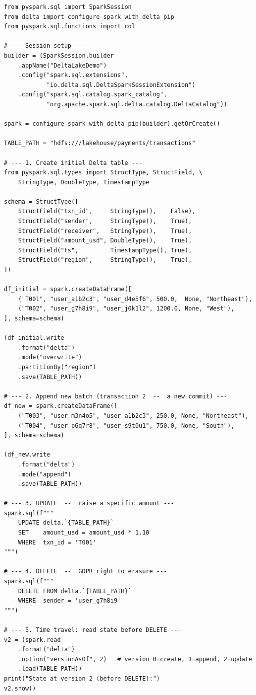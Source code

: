 \begin{lstlisting}[style=pyspark, caption={Delta Lake core operations in PySpark}]
from pyspark.sql import SparkSession
from delta import configure_spark_with_delta_pip
from pyspark.sql.functions import col

# --- Session setup ---
builder = (SparkSession.builder
    .appName("DeltaLakeDemo")
    .config("spark.sql.extensions",
            "io.delta.sql.DeltaSparkSessionExtension")
    .config("spark.sql.catalog.spark_catalog",
            "org.apache.spark.sql.delta.catalog.DeltaCatalog"))

spark = configure_spark_with_delta_pip(builder).getOrCreate()

TABLE_PATH = "hdfs:///lakehouse/payments/transactions"

# --- 1. Create initial Delta table ---
from pyspark.sql.types import StructType, StructField, \
    StringType, DoubleType, TimestampType

schema = StructType([
    StructField("txn_id",     StringType(),    False),
    StructField("sender",     StringType(),    True),
    StructField("receiver",   StringType(),    True),
    StructField("amount_usd", DoubleType(),    True),
    StructField("ts",         TimestampType(), True),
    StructField("region",     StringType(),    True),
])

df_initial = spark.createDataFrame([
    ("T001", "user_a1b2c3", "user_d4e5f6", 500.0,  None, "Northeast"),
    ("T002", "user_g7h8i9", "user_j0k1l2", 1200.0, None, "West"),
], schema=schema)

(df_initial.write
    .format("delta")
    .mode("overwrite")
    .partitionBy("region")
    .save(TABLE_PATH))

# --- 2. Append new batch (transaction 2  --  a new commit) ---
df_new = spark.createDataFrame([
    ("T003", "user_m3n4o5", "user_a1b2c3", 250.0, None, "Northeast"),
    ("T004", "user_p6q7r8", "user_s9t0u1", 750.0, None, "South"),
], schema=schema)

(df_new.write
    .format("delta")
    .mode("append")
    .save(TABLE_PATH))

# --- 3. UPDATE  --  raise a specific amount ---
spark.sql(f"""
    UPDATE delta.`{TABLE_PATH}`
    SET    amount_usd = amount_usd * 1.10
    WHERE  txn_id = 'T001'
""")

# --- 4. DELETE  --  GDPR right to erasure ---
spark.sql(f"""
    DELETE FROM delta.`{TABLE_PATH}`
    WHERE  sender = 'user_g7h8i9'
""")

# --- 5. Time travel: read state before DELETE ---
v2 = (spark.read
    .format("delta")
    .option("versionAsOf", 2)   # version 0=create, 1=append, 2=update
    .load(TABLE_PATH))
print("State at version 2 (before DELETE):")
v2.show()


\end{lstlisting}
